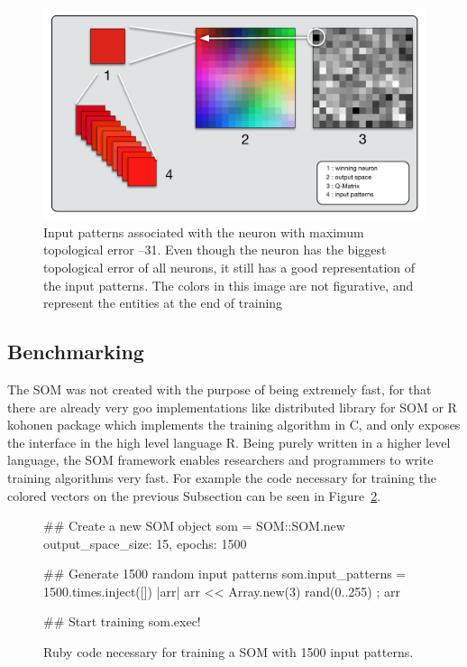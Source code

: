 \begin{figure}[h!]
  \centering
  \includegraphics[width=0.8\linewidth]{./images/som_trainned.pdf}
  \caption{Input patterns associated with the neuron with maximum topological error --31. Even though the neuron has the biggest topological error of all neurons, it still has a good representation of the input patterns. The colors in this image are not figurative, and represent the entities at the end of training  }
  \label{fig:somtrained}
\end{figure}

\subsection{Benchmarking}
\label{sub:benchmarking}
The \ac{SOM} was not created with the purpose of being extremely fast, for that there are already very goo implementations like \citet{somoclu} distributed library for \ac{SOM} or \citet{rsom} R kohonen package which implements the training algorithm in C, and only exposes the interface in the high level language R.  
Being purely written in a higher level language, the \ac{SOM} framework enables researchers and programmers to write training algorithms very fast. For example the code necessary for training the colored vectors on the previous Subsection can be seen in Figure~\ref{fig:rubysom}.

\begin{figure}[h!]
  \centering
  \begin{boxedverbatim}
  ## Create a new SOM object
  som = SOM::SOM.new output_space_size: 15, epochs: 1500

  ## Generate 1500 random input patterns
  som.input_patterns = 1500.times.inject([]){ |arr| arr << Array.new(3){ rand(0..255) }; arr  }

  ## Start training
  som.exec!
  \end{boxedverbatim}
  \caption{ Ruby code necessary for training a SOM with 1500 input patterns.  }
  \label{fig:rubysom}
\end{figure}

